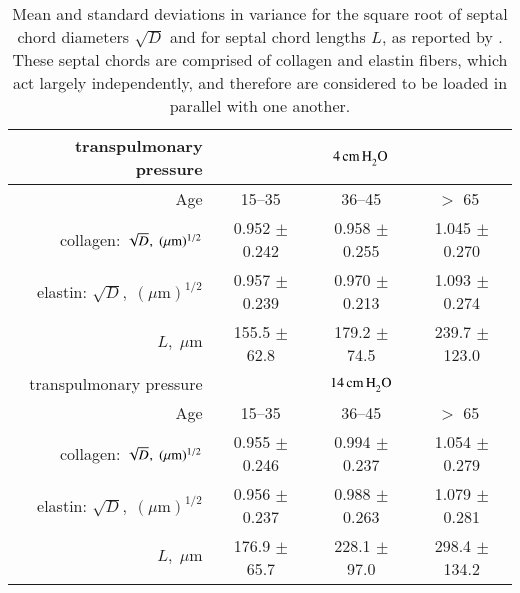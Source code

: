 \begin{table}
    \centering
	\begin{tabular}{|r|ccc|} 
		\hline 
		transpulmonary pressure &
		\multicolumn{3}{|c|}{$4 \, \mathrm{cm} \, \mathrm{H}_2^{\vphantom{|}} \mathrm{O}$} \\ 
		\hline
		Age & 15--35 & 36--45 & $>$ 65 $\vphantom{|}^{\vphantom{|}}$ \\ \hline 
		collagen: $\sqrt{D}^{\vphantom{|}}, \; ( \mu \textrm{m} )^{1/2}$ & 
		0.952 $\pm$ 0.242 & 0.958 $\pm$ 0.255 & 1.045 $\pm$ 0.270 \\
		elastin: $\sqrt{D}, \; ( \mu \textrm{m} )^{1/2}$ & 
		0.957 $\pm$ 0.239 & 0.970 $\pm$ 0.213 & 1.093 $\pm$ 0.274 \\
		$L, \; \mu \textrm{m}$ & 
		155.5 $\pm$ 62.8 & 179.2 $\pm$ 74.5 & 239.7 $\pm$ 123.0 \\ 
		\hline\hline       
		transpulmonary pressure &
		\multicolumn{3}{|c|}{$14 \, \mathrm{cm} \, \mathrm{H}_2^{\vphantom{|}} \mathrm{O}$} \\ 
		\hline
		Age & 15--35 & 36--45 & $>$ 65 $\vphantom{|}^{\vphantom{|}}$ \\ \hline 
		collagen: $\sqrt{D}^{\vphantom{|}}, \; ( \mu \textrm{m} )^{1/2}$ & 
		0.955 $\pm$ 0.246 & 0.994 $\pm$ 0.237 & 1.054 $\pm$ 0.279 \\
		elastin: $\sqrt{D}, \; ( \mu \textrm{m} )^{1/2}$ & 
		0.956 $\pm$ 0.237 & 0.988 $\pm$ 0.263 & 1.079 $\pm$ 0.281 \\
		$L, \; \mu \textrm{m}$ & 
		176.9 $\pm$ 65.7 & 228.1 $\pm$ 97.0 & 298.4 $\pm$ 134.2 \\ 
		\hline
	\end{tabular}
	\caption{\label{tab:alveolarProp}
		Mean and standard deviations in variance for the square root of septal chord diameters $\sqrt{D}$ and for septal chord lengths $L$, as reported by \cite{Sobinetal88}.  These septal chords are comprised of collagen and elastin fibers, which act largely independently, and therefore are considered to be loaded in parallel with one another.}
\end{table}

